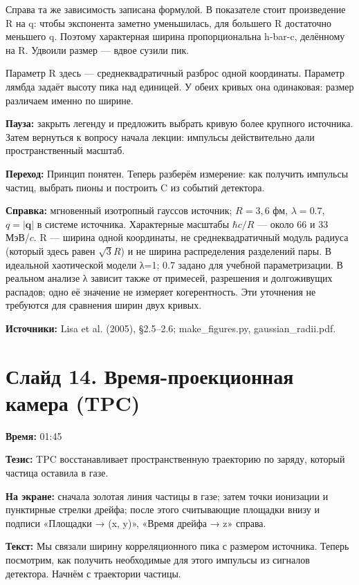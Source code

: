 \documentclass[11pt,a4paper]{article}
\newcommand{\hc}{\hbar c}
\begin{document}
Справа та же зависимость записана формулой. В показателе стоит произведение R на q: чтобы экспонента заметно уменьшилась, для большего R достаточно меньшего q. Поэтому характерная ширина пропорциональна h-bar-c, делённому на R. Удвоили размер — вдвое сузили пик.

Параметр R здесь — среднеквадратичный разброс одной координаты. Параметр лямбда задаёт высоту пика над единицей. У обеих кривых она одинаковая: размер различаем именно по ширине.

\textbf{Пауза:} закрыть легенду и предложить выбрать кривую более крупного источника. Затем вернуться к вопросу начала лекции: импульсы действительно дали пространственный масштаб.

\textbf{Переход:} Принцип понятен. Теперь разберём измерение: как получить импульсы частиц, выбрать пионы и построить C из событий детектора.

\textbf{Справка:} мгновенный изотропный гауссов источник; \(R=3,6\) фм, \(\lambda=0.7\), \(q=|\mathbf q|\) в системе источника. Характерные масштабы \(\hc/R\) — около 66 и 33 МэВ/\(c\). R — ширина одной координаты, не среднеквадратичный модуль радиуса (который здесь равен \(\sqrt3R\)) и не ширина распределения разделений пары. В идеальной хаотической модели λ=1; 0.7 задано для учебной параметризации. В реальном анализе λ зависит также от примесей, разрешения и долгоживущих распадов; одно её значение не измеряет когерентность. Эти уточнения не требуются для сравнения ширин двух кривых.

\textbf{Источники:} Lisa et al. (2005), §2.5–2.6; make\_figures.py, gaussian\_radii.pdf.

\clearpage
\section*{Слайд 14. Время-проекционная камера (TPC)}
\textbf{Время:} 01:45

\textbf{Тезис:} TPC восстанавливает пространственную траекторию по заряду, который частица оставила в газе.

\textbf{На экране:} сначала золотая линия частицы в газе; затем точки ионизации и пунктирные стрелки дрейфа; после этого считывающие площадки внизу и подписи «Площадки → (x, y)», «Время дрейфа → z» справа.

\textbf{Текст:} Мы связали ширину корреляционного пика с размером источника. Теперь посмотрим, как получить необходимые для этого импульсы из сигналов детектора. Начнём с траектории частицы.
\end{document}
